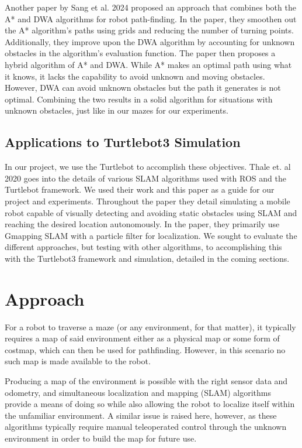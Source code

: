 \documentclass{article}
\begin{document}
Another paper by Sang et al. 2024 proposed an approach that combines both the A* and DWA algorithms for robot path-finding. In the paper, they smoothen out the A* algorithm's paths using grids and reducing the number of turning points. Additionally, they improve upon the DWA algorithm by accounting for unknown obstacles in the algorithm's evaluation function. The paper then proposes a hybrid algorithm of A* and DWA. While A* makes an optimal path using what it knows, it lacks the capability to avoid unknown and moving obstacles. However, DWA can avoid unknown obstacles but the path it
generates is not optimal. Combining the two results in a solid algorithm for situations with unknown obstacles, just like in our mazes for our experiments.

\subsection{Applications to Turtlebot3 Simulation}


In our project, we use the Turtlebot to accomplish these objectives. Thale et. al 2020 goes into the details of various SLAM algorithms used with ROS and the Turtlebot framework. We used their work and this paper as a guide for our project and experiments. Throughout the paper they detail simulating a mobile robot capable of visually detecting and
avoiding static obstacles using SLAM and reaching the desired
location autonomously. In the paper, they primarily use Gmapping SLAM with a particle filter for localization. We sought to evaluate the different approaches, but testing with other algorithms, to accomplishing this with the Turtlebot3 framework and simulation, detailed in the coming sections. 

\section{Approach}

For a robot to traverse a maze (or any environment, for that matter), it typically requires a map of said environment either as a physical map or some form of costmap, which can then be used for pathfinding. However, in this scenario no such map is made available to the robot. 

Producing a map of the environment is possible with the right sensor data and odometry, and simultaneous localization and mapping (SLAM) algorithms provide a means of doing so while also allowing the robot to localize itself within the unfamiliar environment. A similar issue is raised here, however, as these algorithms typically require manual teleoperated control through the unknown environment in order to build the map for future use. 
\end{document}
